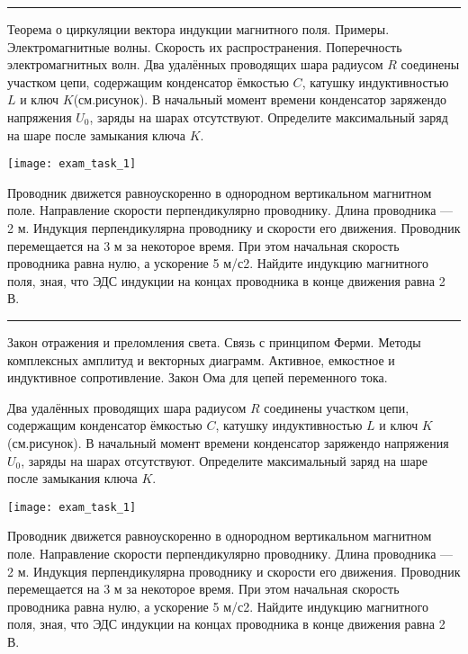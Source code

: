 \documentclass[a5paper, landscape]{exam}
\begin{document}
\rule{1\textwidth}{0.4pt}
\begin{questions}
\question Теорема о циркуляции вектора индукции магнитного поля. Примеры.
\question Электромагнитные волны. Скорость их распространения. Поперечность электромагнитных волн. 
\question Два удалённых проводящих шара радиусом $R$ соединены участком цепи, содержащим конденсатор ёмкостью $C$, катушку индуктивностью $L$ и ключ $K$(см.рисунок). В начальный момент времени конденсатор заряжендо напряжения $U_0$, заряды на шарах отсутствуют. Определите максимальный заряд на шаре после замыкания ключа $K$.

\texttt{[image: exam\_task\_1]}


\question Проводник движется равноускоренно в однородном вертикальном магнитном поле. Направление скорости перпендикулярно проводнику. Длина проводника — 2 м. Индукция перпендикулярна проводнику и скорости его движения. Проводник перемещается на 3 м за некоторое время. При этом начальная скорость проводника равна нулю, а ускорение 5 м/с2. Найдите индукцию магнитного поля, зная, что ЭДС индукции на концах проводника в конце движения равна 2 В.
\end{questions}


\newpage

\rule{1\textwidth}{0.4pt}
\begin{questions}
\question Закон отражения и преломления света. Связь с принципом Ферми.
\question  Методы комплексных амплитуд и векторных диаграмм. Активное, емкостное и индуктивное сопротивление. Закон Ома для цепей переменного тока.
 
\question Два удалённых проводящих шара радиусом $R$ соединены участком цепи, содержащим конденсатор ёмкостью $C$, катушку индуктивностью $L$ и ключ $K$(см.рисунок). В начальный момент времени конденсатор заряжендо напряжения $U_0$, заряды на шарах отсутствуют. Определите максимальный заряд на шаре после замыкания ключа $K$.

\texttt{[image: exam\_task\_1]}


\question Проводник движется равноускоренно в однородном вертикальном магнитном поле. Направление скорости перпендикулярно проводнику. Длина проводника — 2 м. Индукция перпендикулярна проводнику и скорости его движения. Проводник перемещается на 3 м за некоторое время. При этом начальная скорость проводника равна нулю, а ускорение 5 м/с2. Найдите индукцию магнитного поля, зная, что ЭДС индукции на концах проводника в конце движения равна 2 В.
\end{questions}
\end{document}
